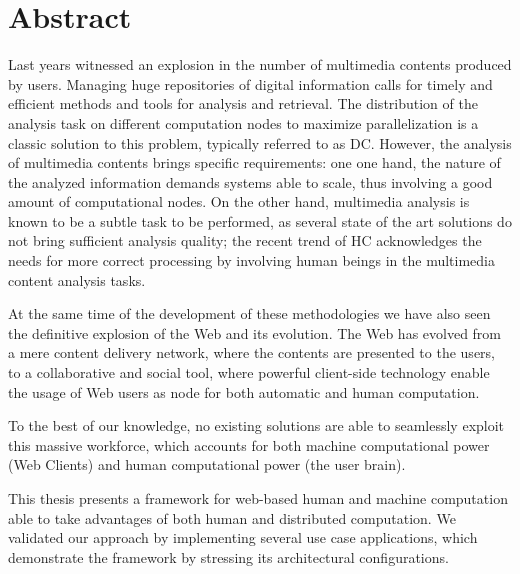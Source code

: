 \vfill

\newpage
{}
\chapter*{Abstract}

Last years witnessed an explosion in the number of multimedia contents produced
by users. Managing huge repositories of digital information calls for timely and
efficient methods and tools for analysis and retrieval. The distribution of the
analysis task on different computation nodes to maximize parallelization is a
classic solution to this problem, typically referred to as \ac{DC}. However,
the analysis of multimedia contents brings specific requirements: one one hand,
the nature of the analyzed information demands systems able to scale, thus
involving a good amount of computational nodes. On the other hand, multimedia
analysis is known to be a subtle task to be performed, as several state of the
art solutions do not bring sufficient analysis quality; the recent trend of \ac{HC}
acknowledges the needs for more correct processing by involving human beings in
the multimedia content analysis tasks.

At the same time of the development of these methodologies we have also
seen the definitive explosion of the Web and its evolution.
The Web has evolved from a mere content delivery network, where the contents are
presented to the users, to a collaborative and social tool, where powerful
client-side technology enable the usage of Web users as node for both automatic
and human computation. 


To the best of our knowledge, no existing solutions are able to seamlessly exploit
this massive workforce, which accounts for both machine computational power
(Web Clients) and human computational power (the user brain). 

This thesis presents a framework for web-based human and machine
computation able to take advantages of both human and distributed computation.
We validated our approach by implementing several use case applications, which
demonstrate the framework by stressing its architectural configurations.
\endgroup			

\vfill

